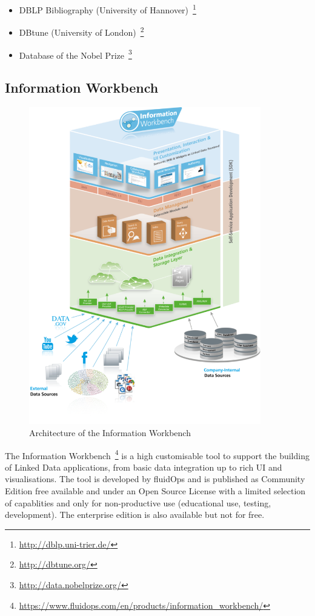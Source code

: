 \begin{itemize}
\item DBLP Bibliography (University of Hannover)~\footnote{\url{http://dblp.uni-trier.de/}}
\item DBtune (University of London)~\footnote{\url{http://dbtune.org/}}
\item Database of the Nobel Prize~\footnote{\url{http://data.nobelprize.org/}}
\end{itemize}

\subsection{Information Workbench}

\begin{figure}[ht]
	\centering
\includegraphics[width=0.9\textwidth]{img/information_workbench_architecture.png}
	\caption{Architecture of the Information Workbench}
	\label{iw_architecture}
\end{figure}

The Information Workbench~\footnote{\url{https://www.fluidops.com/en/products/information_workbench/}} is a high customisable tool to support the building of Linked Data applications, from basic data integration up to rich UI and visualisations. The tool is developed by fluidOps and is published as Community Edition free available and under an Open Source License with a limited selection of capablities and only for non-productive use (educational use, testing, development). The enterprise edition is also available but not for free.

